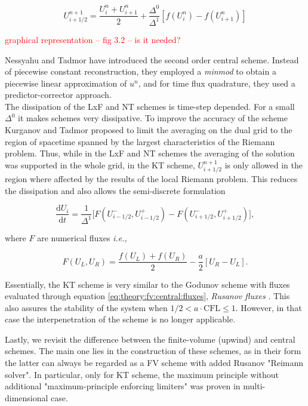 \begin{equation}
U_{i+1/2}^{n+1} = \frac{U_i ^n + U_{i+1}^n}{2} + \frac{\Delta^0}{\Delta^1}[f(U_i ^n) - f(U_{i+1} ^n)]
\end{equation}

\textcolor{red}{graphical representation -- fig 3.2 -- is it needed?}

Nessyahu and Tadmor \cite{Nessyahu:1990} have introduced the second order central scheme. Instead of piecewise constant reconstruction, they employed a \textit{minmod} to obtain a piecewise linear approximation of $u^n$, and for time flux quadrature, they used a predictor-corrector approach. \\

The dissipation of the LxF and NT schemes is time-step depended. For a small $\Delta^0$ it makes schemes very dissipative. To improve the accuracy of the scheme Kurganov and Tadmor \cite{Kurganov:2000} proposed to limit the averaging on the dual grid to the region of spacetime spanned by the largest characteristics of the Riemann problem. Thus, while in the LxF and NT schemes the averaging of the solution was supported in the whole grid, in the KT scheme, $U^{n+1}_{i+1/2}$ is only allowed in the region where affected by the results of the local Riemann problem. This reduces the dissipation and also allows the semi-discrete formulation 

\begin{equation}
\frac{\text{d} U_i}{\text{d} t} = \frac{1}{\Delta^{1}}\big[F(U_{i-1/2}^{-},U_{i-1/2}^{+}) - F(U_{i+1/2}^{-},U_{i+1/2}^{+})\big],
\end{equation}

where $F$ are numerical fluxes \textit{i.e.,}

\begin{equation}
F(U_L, U_R) = \frac{f(U_L) + f(U_R)}{2} - \frac{a}{2}[U_R - U_L].
\label{eq:theory:fv:central:fluxes}
\end{equation}

Essentially, the KT scheme is very similar to the Godunov scheme with fluxes evaluated through equation \ref{eq:theory:fv:central:fluxes}, \textit{Rusanov fluxes} \cite{Kurganov:2000}. This also assures the stability of the system when $1/2 < a \cdot \text{CFL} \leq 1$. However, in that case the interpenetration of the scheme is no longer applicable. 

Lastly, we revisit the difference between the finite-volume (upwind) and central schemes. The main one lies in the construction of these schemes, as in their form the latter can always be regarded as a FV scheme with added Rusanov "Reimann solver". In particular, only for KT scheme, the maximum principle without additional "maximum-principle enforcing limiters" was proven in multi-dimensional case.


